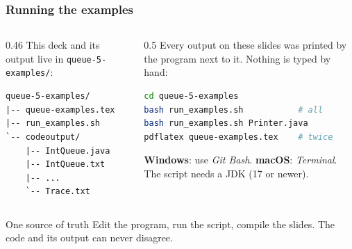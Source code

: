 \documentclass[aspectratio=169,10pt,compress]{beamer}
\newcommand{\win}{\textbf{Windows}}
\newcommand{\mac}{\textbf{macOS}}
\begin{document}
\begin{frame}[t,fragile] \frametitle{Running the examples}
  \begin{columns}[T]
    \begin{column}{0.46\textwidth}
      \small This deck and its output live in \texttt{queue-5-examples/}:


\begin{lstlisting}[style=codesnippet, language={}, basicstyle=\ttfamily\scriptsize]
queue-5-examples/
|-- queue-examples.tex
|-- run_examples.sh
`-- codeoutput/
    |-- IntQueue.java
    |-- IntQueue.txt
    |-- ...
    `-- Trace.txt
\end{lstlisting}


    \end{column}
    \begin{column}{0.5\textwidth}
      \small Every output on these slides was printed by the program next to it. Nothing is typed by hand:


\begin{lstlisting}[style=codesnippet, language=bash, basicstyle=\ttfamily\scriptsize]
cd queue-5-examples
bash run_examples.sh           # all
bash run_examples.sh Printer.java
pdflatex queue-examples.tex    # twice
\end{lstlisting}


      \scriptsize \win: use \emph{Git Bash}. \mac: \emph{Terminal}. The script needs a JDK (17 or newer).
    \end{column}
  \end{columns}
  \vspace{0.4em}
  \begin{block}{One source of truth}
    \small Edit the program, run the script, compile the slides. The code and its output can never disagree.
  \end{block}
\end{frame}
\end{document}
